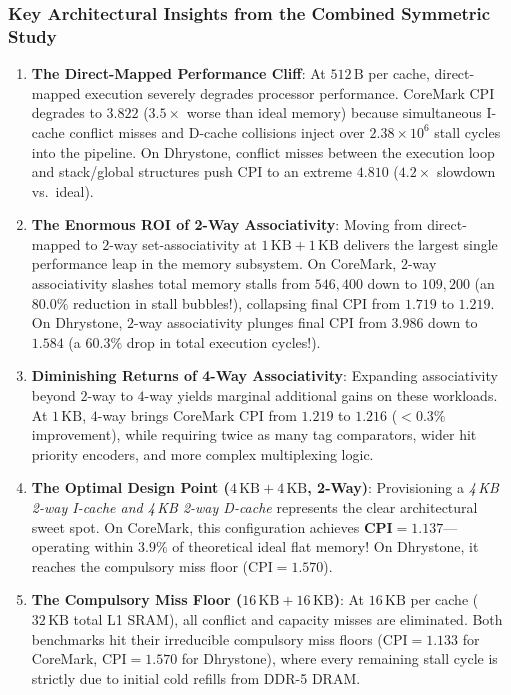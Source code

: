 \subsubsection{Key Architectural Insights from the Combined Symmetric Study}
\begin{enumerate}
    \item \textbf{The Direct-Mapped Performance Cliff}: At $512\,\text{B}$ per cache, direct-mapped execution severely degrades processor performance. CoreMark CPI degrades to $\mathbf{3.822}$ ($3.5\times$ worse than ideal memory) because simultaneous I-cache conflict misses and D-cache collisions inject over $2.38\times 10^6$ stall cycles into the pipeline. On Dhrystone, conflict misses between the execution loop and stack/global structures push CPI to an extreme $\mathbf{4.810}$ ($4.2\times$ slowdown vs.\ ideal).
    \item \textbf{The Enormous ROI of 2-Way Associativity}: Moving from direct-mapped to $2$-way set-associativity at $1\,\text{KB} + 1\,\text{KB}$ delivers the largest single performance leap in the memory subsystem. On CoreMark, $2$-way associativity slashes total memory stalls from $546,400$ down to $109,200$ (an $\mathbf{80.0\%}$ reduction in stall bubbles!), collapsing final CPI from $\mathbf{1.719}$ to $\mathbf{1.219}$. On Dhrystone, $2$-way associativity plunges final CPI from $\mathbf{3.986}$ down to $\mathbf{1.584}$ (a $\mathbf{60.3\%}$ drop in total execution cycles!).
    \item \textbf{Diminishing Returns of 4-Way Associativity}: Expanding associativity beyond $2$-way to $4$-way yields marginal additional gains on these workloads. At $1\,\text{KB}$, $4$-way brings CoreMark CPI from $1.219$ to $1.216$ ($<0.3\%$ improvement), while requiring twice as many tag comparators, wider hit priority encoders, and more complex multiplexing logic.
    \item \textbf{The Optimal Design Point ($4\,\text{KB} + 4\,\text{KB}$, 2-Way)}: Provisioning a \textit{4\,KB 2-way I-cache and 4\,KB 2-way D-cache} represents the clear architectural sweet spot. On CoreMark, this configuration achieves $\mathbf{\text{CPI} = 1.137}$---operating within $\mathbf{3.9\%}$ of theoretical ideal flat memory! On Dhrystone, it reaches the compulsory miss floor ($\text{CPI} = 1.570$).
    \item \textbf{The Compulsory Miss Floor ($16\,\text{KB} + 16\,\text{KB}$)}: At $16\,\text{KB}$ per cache ($32\,\text{KB}$ total L1 SRAM), all conflict and capacity misses are eliminated. Both benchmarks hit their irreducible compulsory miss floors ($\text{CPI} = 1.133$ for CoreMark, $\text{CPI} = 1.570$ for Dhrystone), where every remaining stall cycle is strictly due to initial cold refills from DDR-5 DRAM.
\end{enumerate}


